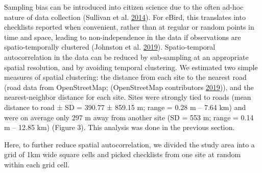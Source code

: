 \documentclass[
]{article}
\newenvironment{Shaded}{}{}
\newcommand{\CommentTok}[1]{\textcolor[rgb]{0.00,0.50,0.00}{#1}}
\newcommand{\DataTypeTok}[1]{#1}
\newcommand{\DecValTok}[1]{#1}
\newcommand{\KeywordTok}[1]{\textcolor[rgb]{0.00,0.00,1.00}{#1}}
\newcommand{\NormalTok}[1]{#1}
\newcommand{\OperatorTok}[1]{#1}
\newcommand{\StringTok}[1]{\textcolor[rgb]{0.00,0.50,0.50}{#1}}
\begin{document}
Sampling bias can be introduced into citizen science due to the often ad-hoc nature of data collection (Sullivan et al. \protect\hyperlink{ref-sullivan2014}{2014}). For eBird, this translates into checklists reported when convenient, rather than at regular or random points in time and space, leading to non-independence in the data if observations are spatio-temporally clustered (Johnston et al. \protect\hyperlink{ref-johnston2019a}{2019}). Spatio-temporal autocorrelation in the data can be reduced by sub-sampling at an appropriate spatial resolution, and by avoiding temporal clustering. We estimated two simple measures of spatial clustering: the distance from each site to the nearest road (road data from OpenStreetMap; (OpenStreetMap contributors \protect\hyperlink{ref-OpenStreetMap}{2019})), and the nearest-neighbor distance for each site. Sites were strongly tied to roads (mean distance to road ± SD = 390.77 ± 859.15 m; range = 0.28 m -- 7.64 km) and were on average only 297 m away from another site (SD = 553 m; range = 0.14 m -- 12.85 km) (Figure 3). This analysis was done in the previous section.

Here, to further reduce spatial autocorrelation, we divided the study area into a grid of 1km wide square cells and picked checklists from one site at random within each grid cell.

\begin{Shaded}
\end{Shaded}
\end{document}
